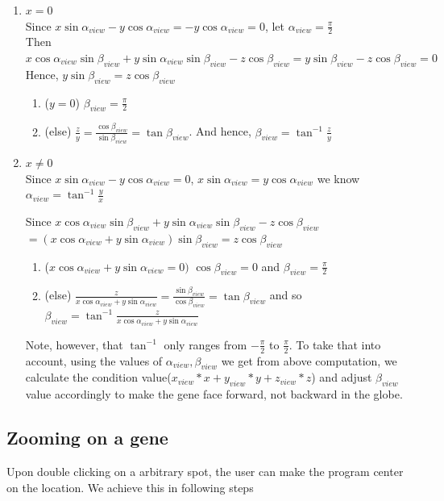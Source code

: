 \documentclass[]{article}
\begin{document}
 \begin{enumerate}
 \item $x = 0$ \\
 Since $x \sin \alpha_{view} -y\cos \alpha_{view} = -y\cos \alpha_{view} =0$, let $\alpha_{view}=\frac{\pi}{2}$\\
 Then $x\cos \alpha_{view} \sin \beta_{view} + y\sin \alpha_{view} \sin \beta_{view} -z\cos \beta_{view}= y \sin \beta_{view} - z \cos \beta_{view} = 0$\\
 Hence, $y \sin \beta_{view} = z \cos \beta_{view}$
 \begin{enumerate}
 \item ($y=0$) $\beta_{view} = \frac{\pi}{2}$
 \item (else) $\frac{z}{y} = \frac{\cos \beta_{view}}{\sin \beta_{view}}=\tan \beta_{view}$. And hence, $\beta_{view} = \tan^{-1} \frac{z}{y}$
 \end{enumerate}
 
 \item $x \neq 0$\\
 Since $x \sin \alpha_{view} -y\cos \alpha_{view} = 0$, $x \sin \alpha_{view} = y\cos \alpha_{view}$ we know $\alpha_{view} = \tan^{-1}\frac{y}{x} $

 
Since $x\cos \alpha_{view} \sin \beta_{view} + y\sin \alpha_{view} \sin \beta_{view} -z\cos \beta_{view}$
 $=(x\cos \alpha_{view} + y\sin \alpha_{view})\sin \beta_{view}=z\cos \beta_{view}$
  \begin{enumerate}
	\item ($x\cos \alpha_{view} + y\sin \alpha_{view}=0)$ $\cos \beta_{view} = 0$ and $\beta_{view} = \frac{\pi}{2}$
	\item (else) $\frac{z}{x\cos \alpha_{view} + y\sin \alpha_{view}} = \frac{\sin \beta_{view}}{\cos \beta_{view}}= \tan {\beta_{view}}$ and so $\beta_{view}= \tan^{-1 }\frac{z}{x\cos \alpha_{view} + y\sin \alpha_{view}}$
 \end{enumerate}
 
 Note, however, that $\tan^{-1}$ only ranges from $-\frac{\pi}{2}$ to $\frac{\pi}{2}$. To take that into account, using the values of $\alpha_{view},\beta_{view}$ we get from above computation, we calculate the condition value($x_{view} * x + y_{view} * y + z_{view} * z$) and adjust $\beta_{view}$ value accordingly to make the gene face forward, not backward in the globe.
\end{enumerate} 
 
 \subsection{Zooming on a gene}
 Upon double clicking on a arbitrary spot, the user can make the program center on the location. We achieve this in following steps 
 
\end{document}
